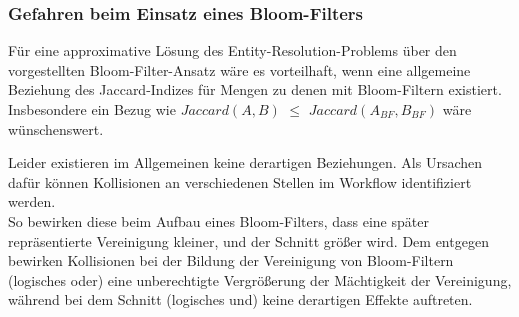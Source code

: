 \newpage
\subsubsection{Gefahren beim Einsatz eines Bloom-Filters}

Für eine approximative Lösung des Entity-Resolution-Problems über den vorgestellten Bloom-Filter-Ansatz
wäre es vorteilhaft, wenn eine allgemeine Beziehung des Jaccard-Indizes für Mengen zu denen mit
Bloom-Filtern existiert.
Insbesondere ein Bezug wie $Jaccard(A, B)$ $\leq$ $Jaccard(A_{BF}, B_{BF})$ wäre wünschenswert.

Leider existieren im Allgemeinen keine derartigen Beziehungen.
Als Ursachen dafür können Kollisionen an verschiedenen Stellen im Workflow identifiziert werden.\\
So bewirken diese beim Aufbau eines Bloom-Filters, dass eine später repräsentierte
Vereinigung kleiner, und der Schnitt größer wird.
Dem entgegen bewirken Kollisionen bei der Bildung der Vereinigung von Bloom-Filtern (logisches oder) eine
unberechtigte Vergrößerung der Mächtigkeit der Vereinigung, während bei dem Schnitt (logisches und)
keine derartigen Effekte auftreten.
